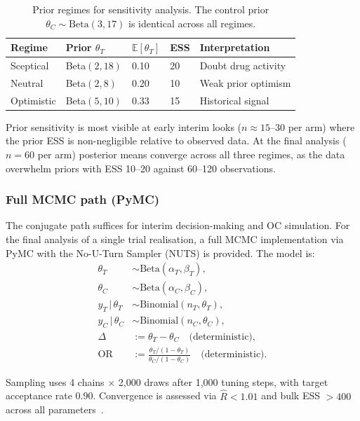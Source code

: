 \documentclass[11pt,a4paper]{article}
\newcommand{\E}{\mathbb{E}}
\newcommand{\given}{\,|\,}
\newcommand{\thetaT}{\theta_T}
\newcommand{\thetaC}{\theta_C}
\begin{document}
\begin{table}[h]
\centering
\begin{tabular}{@{}lllll@{}}
\toprule
Regime & Prior $\thetaT$ & $\E[\thetaT]$ & ESS & Interpretation \\
\midrule
Sceptical  & Beta$(2, 18)$ & 0.10 & 20 & Doubt drug activity \\
Neutral    & Beta$(2, 8)$  & 0.20 & 10 & Weak prior optimism \\
Optimistic & Beta$(5, 10)$ & 0.33 & 15 & Historical signal \\
\bottomrule
\end{tabular}
\caption{Prior regimes for sensitivity analysis. The control prior
$\thetaC \sim \text{Beta}(3, 17)$ is identical across all regimes.}
\label{tab:priors}
\end{table}
 
Prior sensitivity is most visible at early interim looks ($n \approx 15$--$30$
per arm) where the prior ESS is non-negligible relative to observed data. At
the final analysis ($n = 60$ per arm) posterior means converge across all three
regimes, as the data overwhelm priors with ESS 10--20 against 60--120
observations.
 
\subsubsection{Full MCMC path (PyMC)}
 
The conjugate path suffices for interim decision-making and OC simulation. For
the final analysis of a single trial realisation, a full MCMC implementation
via PyMC with the No-U-Turn Sampler (NUTS) is provided. The model is:
\begin{align}
  \thetaT &\sim \text{Beta}(\alpha_T, \beta_T), \\
  \thetaC &\sim \text{Beta}(\alpha_C, \beta_C), \\
  y_T \given \thetaT &\sim \text{Binomial}(n_T, \thetaT), \\
  y_C \given \thetaC &\sim \text{Binomial}(n_C, \thetaC), \\
  \Delta &:= \thetaT - \thetaC \quad \text{(deterministic)}, \\
  \text{OR} &:= \frac{\thetaT/(1-\thetaT)}{\thetaC/(1-\thetaC)} \quad \text{(deterministic)}.
\end{align}
 
Sampling uses 4 chains $\times$ 2{,}000 draws after 1{,}000 tuning steps,
with target acceptance rate 0.90. Convergence is assessed via $\hat{R} < 1.01$
and bulk ESS $> 400$ across all parameters~\cite{Vehtari2021}.
 
\end{document}
